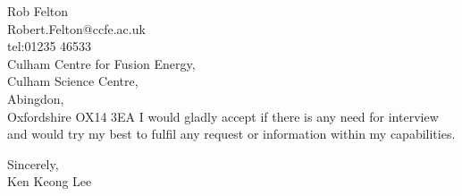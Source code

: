 \documentclass[11pt]{letter} %
\begin{document}
\begin{letter}{Rob Felton\\Robert.Felton@ccfe.ac.uk\\tel:01235 46533\\Culham Centre for Fusion Energy,\\Culham Science Centre,\\Abingdon,\\Oxfordshire OX14 3EA}
I would gladly accept if there is any need for interview and would try my best to fulfil any request or information within my capabilities.



\closing{Sincerely,\\Ken Keong Lee}




\end{letter}
\end{document}
